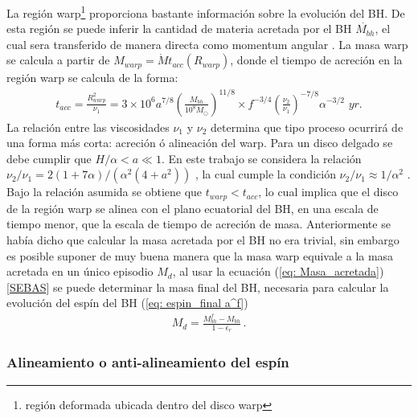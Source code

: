 La región warp\footnote{región deformada ubicada dentro del disco warp} proporciona bastante información sobre la evolución del BH. De esta región se puede inferir la cantidad de materia acretada por el BH $\dot{M_{bh}}$, el cual sera transferido de manera directa como momentum angular \cite{volonteri2007}. La masa warp se calcula a partir de $M_{warp}=\dot{M}t_{acc}(R_{warp})$, donde el tiempo de acreción en la región warp se calcula de la forma:
%
\begin{align}
 t_{acc}=\frac{R^{2}_{warp}}{\nu_{1}} = 3 \times10^{6}a^{7/8} \left(\frac{M_{bh}}{10^{8}M_{\odot}} \right)^{11/8}\times f^{-3/4}\left( \frac{\nu_{2}}{\nu_{1}}\right)^{-7/8}\alpha^{-3/2}\,\, \textit{yr}.
\end{align}
%
La relación entre las viscosidades $\nu_1$ y $\nu_2$ determina que tipo proceso ocurrirá de una forma más corta: acreción ó alineación del warp. Para un disco delgado se debe cumplir que $H/\alpha < a \ll 1$. En este trabajo se considera la relación $\nu_{2}/\nu_{1}=2(1+7\alpha)/(\alpha^{2}(4+a^{2}))$ \cite{ogilvie1999} , la cual cumple la condición $\nu_{2}/\nu_{1}\approx 1/\alpha^{2}$ \cite{papaloizou1983}. Bajo la relación asumida se obtiene que $t_{warp}< t_{acc}$, lo cual implica que el disco de la región warp se alinea con el plano ecuatorial del BH, en una escala de tiempo menor, que la escala de tiempo de acreción de masa. Anteriormente se había dicho que calcular la masa acretada por el BH no era trivial, sin embargo es posible suponer de muy buena manera que la masa warp equivale a la masa acretada en un único episodio $M_{d}$, al usar la ecuación (\ref{eq: Masa_acretada}) [{\underline{SEBAS}}] se puede determinar la masa final del BH, necesaria para calcular la evolución del espín del BH (\ref{eq: espin_final a^f})
%
\begin{align}
 M_{d}= \frac{M_{bh}^{f}-M_{bh}}{1-\epsilon_{r}}\,.
 \label{eq: Masa_acretada}
\end{align}
%
    \subsubsection{Alineamiento o anti-alineamiento del espín}
    \label{subsubsec: Aling_Spin}

